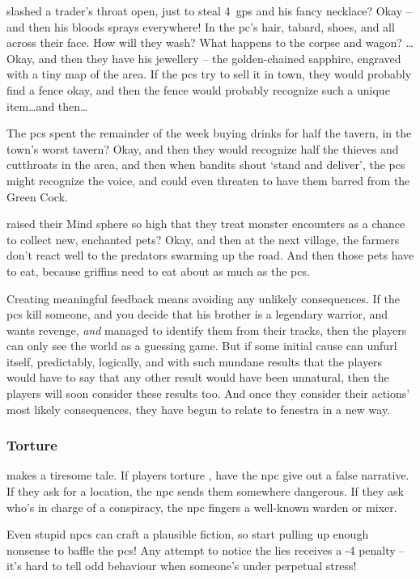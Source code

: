 \begin{multicols}{2}
 slashed a trader's throat open, just to steal 4~\glspl{gp} and his fancy necklace?
Okay -- and then his bloods sprays everywhere!
In the \gls{pc}'s hair, tabard, shoes, and all across their face.
How will they wash?
What happens to the corpse and wagon?
\ldots Okay, and then they have his jewellery -- the golden-chained sapphire, engraved with a tiny map of the area.
If the \glspl{pc} try to sell it in town, they would probably find a fence okay, and then the fence would probably recognize such a unique item\ldots and then\ldots

The \glspl{pc} spent the remainder of the week buying drinks for half the tavern, in the town's worst tavern?
Okay, and then they would recognize half the thieves and cutthroats in the area, and then when bandits shout `stand and deliver', the \glspl{pc} might recognize the voice, and could even threaten to have them barred from the Green Cock.

 raised their Mind \gls{sphere} so high that they treat \gls{monster} encounters as a chance to collect new, enchanted pets?
Okay, and then at the next \gls{village}, the farmers don't react well to the predators swarming up the road.
And then those pets have to eat, because griffins need to eat about as much as the \glspl{pc}.

Creating meaningful feedback means avoiding any unlikely consequences.
If the \glspl{pc} kill someone, and you decide that his brother is a legendary warrior, and wants revenge, \textit{and} managed to identify them from their tracks, then the players can only see the world as a guessing game.
But if some initial cause can unfurl itself, predictably, logically, and with such mundane results that the players would have to say that any other result would have been unnatural, then the players will soon consider these results too.
And once they consider their actions' most likely consequences, they have begun to relate to \gls{fenestra} in a new way.

\subsubsection{Torture}
makes a tiresome tale.
If players torture , have the \gls{npc} give out a false narrative.
If they ask for a location, the \gls{npc} sends them somewhere dangerous.
If they ask who's in charge of a conspiracy, the \gls{npc} fingers a well-known \gls{warden} or \gls{mixer}.

Even stupid \glspl{npc} can craft a plausible fiction, so start pulling up enough nonsense to baffle the \glspl{pc}!
Any attempt to notice the lies receives a -4 penalty -- it's hard to tell odd behaviour when someone's under perpetual stress!


\end{multicols}
